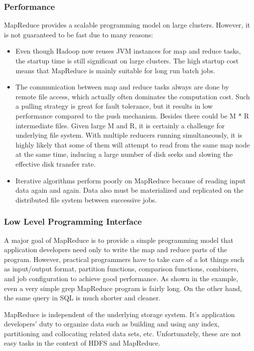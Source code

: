 \documentclass[11pt]{book}
\begin{document}
\subsubsection{Performance}
MapReduce provides a scalable programming model on large clusters. However, it is not guaranteed to be fast due to many reasons:
\begin{itemize}
\item Even though Hadoop now reuses JVM instances for map and reduce tasks, the startup time is still significant on large clusters. The high startup cost means that MapReduce is mainly suitable for long run batch jobs.
\item The communication between map and reduce tasks always are done by remote file access, which actually often dominates the computation cost. Such a pulling strategy is great for fault tolerance, but it results in low performance compared to the push mechanism. Besides there could be M * R intermediate files. Given large M and R, it is certainly a challenge for underlying file system. With multiple reducers running simultaneously, it is highly likely that some of them will attempt to read from the same map node at the same time, inducing a large number of disk seeks and slowing the effective disk transfer rate.
\item Iterative algorithms perform poorly on MapReduce because of reading input data again and again. Data also must be materialized and replicated on the distributed file system between successive jobs.
\end{itemize}
\subsubsection{Low Level Programming Interface}
A major goal of MapReduce is to provide a simple programming model that application developers need only to write the map and reduce parts of the program. However, practical programmers have to take care of a lot things such as input/output format, partition functions, comparison functions, combiners, and job configuration to achieve good performance. As shown in the example, even a very simple grep MapReduce program is fairly long. On the other hand, the same query in SQL is much shorter and cleaner.

MapReduce is independent of the underlying storage system. It's application developers' duty to organize data such as building and using any index, partitioning and collocating related data sets, etc. Unfortunately, these are not easy tasks in the context of HDFS and MapReduce.
\end{document}
